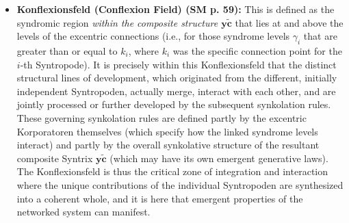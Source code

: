 \documentclass[12pt]{article}
\newcommand{\konflexivsyntrix}{\bm{y\widetilde{c}}}
\begin{document}
\begin{itemize}
    \item \textbf{Konflexionsfeld (Conflexion Field) (SM p. 59):}
    This is defined as the syndromic region \textit{within the composite structure \( \konflexivsyntrix \)} that lies at and above the levels of the excentric connections (i.e., for those syndrome levels \( \gamma_i \) that are greater than or equal to \( k_i \), where \( k_i \) was the specific connection point for the \(i\)-th Syntropode). It is precisely within this Konflexionsfeld that the distinct structural lines of development, which originated from the different, initially independent Syntropoden, actually merge, interact with each other, and are jointly processed or further developed by the subsequent synkolation rules. These governing synkolation rules are defined partly by the excentric Korporatoren themselves (which specify how the linked syndrome levels interact) and partly by the overall synkolative structure of the resultant composite Syntrix \( \konflexivsyntrix \) (which may have its own emergent generative laws). The Konflexionsfeld is thus the critical zone of integration and interaction where the unique contributions of the individual Syntropoden are synthesized into a coherent whole, and it is here that emergent properties of the networked system can manifest.


\end{itemize}
\end{document}
